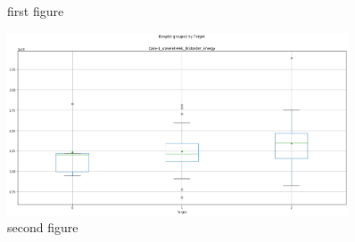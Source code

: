 \documentclass[final,1p,times,twocolumn]{elsarticle}
\begin{document}
\begin{figure}
\begin{minipage}{0.45\textwidth}
        \caption{first figure}
    \end{minipage}\hfill
    \begin{minipage}{0.45\textwidth}
        \centering
        \includegraphics[width=0.9\textwidth]{tg2.png} %
        \caption{second figure}
    \end{minipage}
\end{figure}


% 
% 
\end{document}
